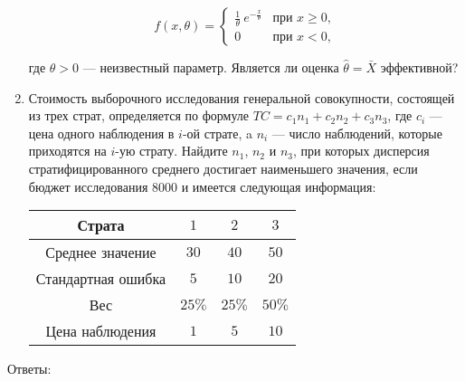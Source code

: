 \documentclass[12pt]{article}
\begin{document}
\begin{enumerate}
\[
f(x,\theta) = 
\begin{cases} 
\frac{1}{\theta} \ e^{-\frac{x}{\theta}} & \text{при } x \geq 0, \\ 
0 & \text{при } x < 0, \end{cases}
\]

где $\theta > 0$ — неизвестный параметр. Является ли оценка  $\hat{\theta} = \bar{X}$ эффективной?

\item Стоимость выборочного исследования генеральной совокупности, состоящей из трех страт, определяется по формуле $TC = c_1n_1 + c_2n_2 + c_3n_3$, где $c_i$ — цена одного наблюдения в $i$-ой страте, a $n_i$ — число наблюдений, которые приходятся на $i$-ую страту. Найдите $n_1$, $n_2$ и $n_3$, при которых дисперсия стратифицированного среднего достигает наименьшего значения, если бюджет исследования 8000 и имеется следующая информация:

\begin{center}
\begin{tabular}{cccc}
\toprule
 Страта & $1$ & $2$ & $3$  \\ 
 \midrule
 Среднее значение & $30$ & $40$ & $50$ \\ 
 Стандартная ошибка  & $5$ & $10$ & $20$ \\ 
 Вес & $25\%$ & $25\%$ & $50\%$ \\ 
 Цена наблюдения & $1$ & $5$ & $10$ \\ 
 \bottomrule
\end{tabular}
\end{center}

\end{enumerate}

Ответы:
\end{document}
